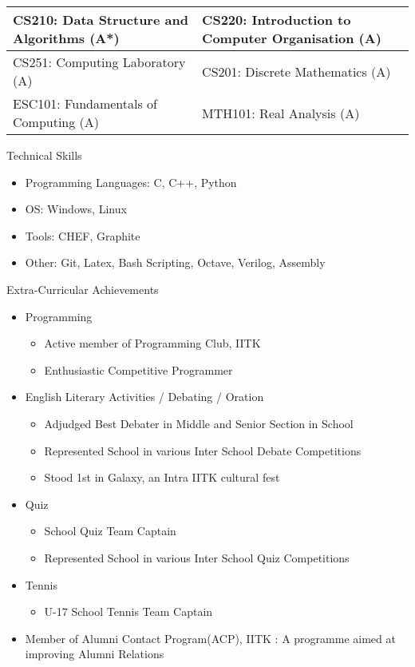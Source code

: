 \documentclass{article}
\begin{document}
\begin{tabular}{|m{8.5cm} | m{8.5cm}|}
\hline
CS210: Data Structure and Algorithms (A*) & CS220: Introduction to Computer Organisation (A)\\ 
\hline
CS251: Computing Laboratory (A) & CS201: Discrete Mathematics (A)\\
\hline
ESC101: Fundamentals of Computing (A) & MTH101: Real Analysis (A)\\
\hline
\end{tabular}
\newline
\newline
\newline
{\Large Technical Skills}
\begin{itemize}
\item Programming Languages: C, C++, Python
\item OS: Windows, Linux
\item Tools: CHEF, Graphite
\item Other: Git, Latex, Bash Scripting, Octave, Verilog, Assembly
\end{itemize} 
\vspace{10pt}
{\Large Extra-Curricular Achievements}
\begin{itemize}
\item Programming
	\begin{itemize}
	\item Active member of Programming Club, IITK
	\item Enthusiastic Competitive Programmer
	\end{itemize}
\item English Literary Activities / Debating / Oration
	\begin{itemize}
	\item Adjudged Best Debater in Middle and Senior Section in School
	\item Represented School in various Inter School Debate Competitions
	\item Stood 1st in Galaxy, an Intra IITK cultural fest 
	\end{itemize}
\item Quiz
	\begin{itemize}
	\item School Quiz Team Captain
	\item Represented School in various Inter School Quiz Competitions
	\end{itemize}
\item Tennis
	\begin{itemize}
	\item U-17 School Tennis Team Captain
	\end{itemize}
\item Member of Alumni Contact Program(ACP), IITK : A programme aimed at improving Alumni Relations
\end{itemize}
\end{document}
